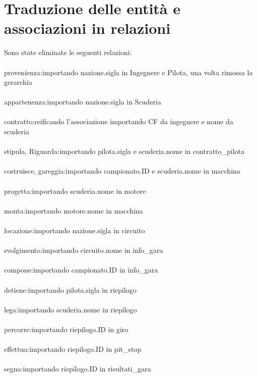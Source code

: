 \documentclass[a4paper,12pt]{report}
\begin{document}
		\section{Traduzione delle entità e associazioni in relazioni}
			Sono state eliminate le seguenti relazioni:\\\\
			provenienza:\tab 			importando nazione.sigla in Ingegnere 
			\tab\tab\tab					e Pilota, una volta rimossa la gerarchia\\\\
			appartenenza:\tab 			importando nazione.sigla in Scuderia\\\\
			contratto:\tab 				reificando l'associazione importando CF 
			\tab\tab\tab				da ingegnere e nome da scuderia\\\\
			stipula, Riguarda:\tab 		importando pilota.sigla e scuderia.nome 
			\tab\tab\tab				in contratto\_pilota\\\\
			costruisce, gareggia:\tab 	importando campionato.ID e scuderia.nome 
			\tab\tab\tab				in macchina\\\\
			progetta:\tab 				importando scuderia.nome in motore\\\\
			monta:\tab 					importando motore.nome in macchina\\\\
			locazione:\tab 				importando nazione.sigla in circuito\\\\
			svolgimento:\tab 			importando circuito.nome in info\_gara\\\\
			compone:\tab 				importando campionato.ID in info\_gara\\\\
			detiene:\tab 				importando pilota.sigla in riepilogo\\\\
			lega:\tab					importando scuderia.nome in riepilogo\\\\
			percorre:\tab				importando riepilogo.ID in giro\\\\
			effettua:\tab				importando riepilogo.ID in pit\_stop\\\\
			segna:\tab					importando riepilogo.ID in risultati\_gara\\\\
\end{document}
